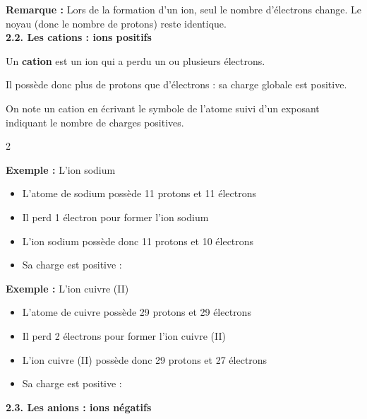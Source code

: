\documentclass[11pt,a4paper]{article}
\begin{document}
\textbf{Remarque : } Lors de la formation d'un ion, seul le nombre d'électrons change. Le noyau (donc le nombre de protons) reste identique. \\


\textbf{2.2. Les cations : ions positifs}

\begin{tcolorbox}[colback=red!5!white,colframe=red!75!black]
{
Un \textbf{cation} est un ion qui a perdu un ou plusieurs électrons.

Il possède donc plus de protons que d'électrons : sa charge globale est positive.

On note un cation en écrivant le symbole de l'atome suivi d'un exposant indiquant le nombre de charges positives.
}
\end{tcolorbox}


\begin{tcolorbox}[colback=red!5!white,colframe=red!75!black]
{

\begin{multicols}{2}

\textbf{Exemple : } L'ion sodium 

\begin{itemize}
    \item L'atome de sodium possède 11 protons et 11 électrons
    \item Il perd 1 électron pour former l'ion sodium
    \item L'ion sodium possède donc 11 protons et 10 électrons
    \item Sa charge est positive : 
\end{itemize}

\textbf{Exemple : } L'ion cuivre (II) 

\begin{itemize}
    \item L'atome de cuivre possède 29 protons et 29 électrons
    \item Il perd 2 électrons pour former l'ion cuivre (II)
    \item L'ion cuivre (II) possède donc 29 protons et 27 électrons
    \item Sa charge est positive : 
\end{itemize}

\end{multicols}
}
\end{tcolorbox}

\textbf{2.3. Les anions : ions négatifs}
\end{document}

